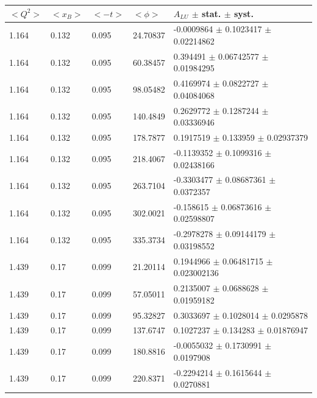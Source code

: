 \begin{table}[!h]
   \begin{center}
      \begin{tabular}{||l|l|l|l|l||}
         \hline
 $<Q^{2}>$ & $<x_{B}>$ & $<-t>$ & $<\phi>$ & $A_{LU}$ $\pm$ stat. $\pm$ syst.\\
         \hline
        1.164 & 0.132 & 0.095 &   24.70837  &    -0.0009864  $\pm$   0.1023417     $\pm$   0.02214862    \\
        1.164 & 0.132 & 0.095 &   60.38457  &     0.394491   $\pm$   0.06742577    $\pm$   0.01984295    \\
        1.164 & 0.132 & 0.095 &   98.05482  &     0.4169974  $\pm$   0.0822727     $\pm$   0.04084068    \\
        1.164 & 0.132 & 0.095 &   140.4849  &     0.2629772  $\pm$   0.1287244     $\pm$   0.03336946    \\
        1.164 & 0.132 & 0.095 &   178.7877  &     0.1917519  $\pm$   0.133959      $\pm$   0.02937379    \\
        1.164 & 0.132 & 0.095 &   218.4067  &    -0.1139352  $\pm$   0.1099316     $\pm$   0.02438166    \\
        1.164 & 0.132 & 0.095 &   263.7104  &    -0.3303477  $\pm$   0.08687361    $\pm$   0.0372357     \\
        1.164 & 0.132 & 0.095 &   302.0021  &    -0.158615   $\pm$   0.06873616    $\pm$   0.02598807    \\
        1.164 & 0.132 & 0.095 &   335.3734  &    -0.2978278  $\pm$   0.09144179    $\pm$   0.03198552    \\
         \hline                                                                         
         1.439 & 0.17 & 0.099 &    21.20114   &    0.1944966  $\pm$   
         0.06481715    $\pm$   0.023002136   \\
        1.439 & 0.17 & 0.099 &    57.05011   &    0.2135007  $\pm$   0.0688628     $\pm$   0.01959182    \\
        1.439 & 0.17 & 0.099 &    95.32827   &    0.3033697  $\pm$   0.1028014     $\pm$   0.0295878     \\
        1.439 & 0.17 & 0.099 &    137.6747   &    0.1027237  $\pm$   0.134283      $\pm$   0.01876947    \\
        1.439 & 0.17 & 0.099 &    180.8816   &   -0.0055032  $\pm$   0.1730991     $\pm$   0.0197908     \\
        1.439 & 0.17 & 0.099 &    220.8371   &   -0.2294214  $\pm$   0.1615644     $\pm$   0.0270881     \\

\end{tabular}
\end{center}
\end{table}
